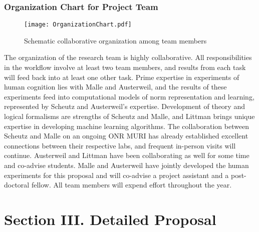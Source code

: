 \documentclass[12pt]{article}
\begin{document}
\subsubsection*{Organization Chart for Project Team}
\vspace{-4mm}

\begin{figure}[h!]
  \centering
  \texttt{[image: OrganizationChart.pdf]}
  \vspace{-1.5mm}
  \caption{\small Schematic collaborative organization among team
    members}
  \label{fig:orgchart}
\end{figure}

\vspace{-1mm}
The organization of the research team is highly collaborative.  All
responsibilities in the workflow involve at least two team members,
and results from each task will feed back into at least one other task.
Prime expertise in experiments of human cognition lies with Malle and Austerweil, and the results of these experiments feed into computational models of norm representation and learning, represented by Scheutz and Austerweil's expertise.  Development of theory and logical formalisms are strengths of Scheutz and Malle, and Littman brings unique expertise in developing machine learning algorithms.  The collaboration between Scheutz and Malle on an
ongoing ONR MURI has already established excellent connections between
their respective labs, and frequent in-person visits will continue.
Austerweil and Littman have been collaborating as well for some time
and co-advise students.  Malle and Austerweil have jointly developed
the human experiments for this proposal and will co-advise a project
assistant and a post-doctoral fellow.  All team members will expend
effort throughout the year.



\newpage
\section*{Section III. Detailed Proposal }
\end{document}
